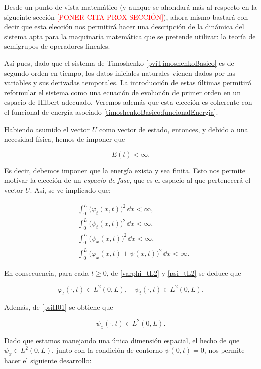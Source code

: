 Desde un punto de vista matemático (y aunque se ahondará más al respecto en la sigueinte sección \textcolor{red}{[PONER CITA PROX SECCIÓN]}), ahora mismo bastará con decir que esta elección nos permitirá hacer una descripción de la dinámica del sistema apta para la maquinaría matemática que se pretende utilizar: la teoría de semigrupos de operadores lineales. 

Así pues, dado que el sistema de Timoshenko \eqref{pviTimoshenkoBasico} es de segundo orden en tiempo, los datos iniciales naturales vienen dados por las variables y sus derivadas temporales. La introducción de estas últimas permitirá reformular el sistema como una ecuación de evolución de primer orden en un espacio de Hilbert adecuado. Veremos además que esta elección es coherente con el funcional de energía asociado \eqref{timoshenkoBasico:funcionalEnergia}.

Habiendo asumido el vector $U$ como vector de estado, entonces, y debido a una necesidad física, hemos de imponer que

\[E(t) < \infty.\]

Es decir, debemos imponer que la energía exista y sea finita. Esto nos permite motivar la elección de un \textit{espacio de fase}, que es el espacio al que pertenecerá el vector $U$. Así, se ve implicado que:

\begin{align}
    &\int_0^L \big(\varphi_t(x,t) \big)^2 \, \dd x < \infty,\label{varphi_tL2}\\
    &\int_0^L \big(\psi_t(x,t) \big)^2 \, \dd x < \infty,\label{psi_tL2}\\
    &\int_0^L \big(\psi_x(x,t) \big)^2 \, \dd x < \infty,\label{psiH01}\\
    &\int_0^L \big(\varphi_x(x,t) + \psi(x,t) \big)^2 \, \dd x < \infty\label{varphiH01}.
\end{align}

En consecuencia, para cada $t \geq 0$, de \eqref{varphi_tL2} y \eqref{psi_tL2} se deduce que

\[
\varphi_t(\cdot,t)\in L^2(0,L), \quad \psi_t(\cdot,t)\in L^2(0,L).
\]

Además, de \eqref{psiH01} se obtiene que

\[
\psi_x(\cdot,t)\in L^2(0,L).
\]

Dado que estamos manejando una única dimensión espacial, el hecho de que $\psi_x \in L^2(0,L)$, junto con la condición de contorno $\psi(0,t) = 0$, nos permite hacer el siguiente desarrollo:

